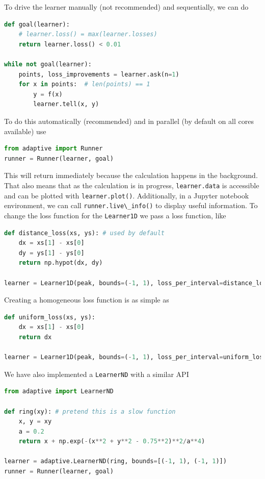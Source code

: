
To drive the learner manually (not recommended) and sequentially, we can do

\begin{lstlisting}[language=Python]
def goal(learner):
    # learner.loss() = max(learner.losses)
    return learner.loss() < 0.01

while not goal(learner):
    points, loss_improvements = learner.ask(n=1)
    for x in points:  # len(points) == 1
        y = f(x)
        learner.tell(x, y)
\end{lstlisting}

To do this automatically (recommended) and in parallel (by default on all cores available) use

\begin{lstlisting}[language=Python]
from adaptive import Runner
runner = Runner(learner, goal)
\end{lstlisting}

This will return immediately because the calculation happens in the background.
That also means that as the calculation is in progress, \passthrough{\lstinline!learner.data!} is accessible and can be plotted with \passthrough{\lstinline!learner.plot()!}.
Additionally, in a Jupyter notebook environment, we can call \passthrough{\lstinline!runner.live\_info()!} to display useful information.
To change the loss function for the \passthrough{\lstinline!Learner1D!} we pass a loss function, like

\begin{lstlisting}[language=Python]
def distance_loss(xs, ys): # used by default
    dx = xs[1] - xs[0]
    dy = ys[1] - ys[0]
    return np.hypot(dx, dy)

learner = Learner1D(peak, bounds=(-1, 1), loss_per_interval=distance_loss)
\end{lstlisting}

Creating a homogeneous loss function is as simple as

\begin{lstlisting}[language=Python]
def uniform_loss(xs, ys):
    dx = xs[1] - xs[0]
    return dx

learner = Learner1D(peak, bounds=(-1, 1), loss_per_interval=uniform_loss)
\end{lstlisting}

We have also implemented a \passthrough{\lstinline!LearnerND!} with a similar API

\begin{lstlisting}[language=Python]
from adaptive import LearnerND

def ring(xy): # pretend this is a slow function
    x, y = xy
    a = 0.2
    return x + np.exp(-(x**2 + y**2 - 0.75**2)**2/a**4)

learner = adaptive.LearnerND(ring, bounds=[(-1, 1), (-1, 1)])
runner = Runner(learner, goal)
\end{lstlisting}

